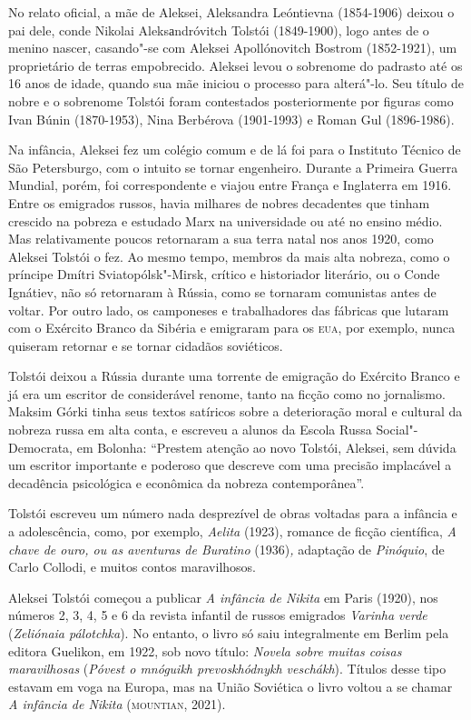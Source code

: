 \documentclass[11pt]{extarticle}
\begin{document}
No relato oficial, a mãe de Aleksei, Aleksandra Leóntievna (1854-1906)
deixou o pai dele, conde Nikolai Aleksаndróvitch Tolstói (1849-1900),
logo antes de o menino nascer, casando"-se com Aleksei Apollónovitch
Bostrom (1852-1921), um proprietário de terras empobrecido. Aleksei
levou o sobrenome do padrasto até os 16 anos de idade, quando sua mãe
iniciou o processo para alterá"-lo. Seu título de nobre e o sobrenome
Tolstói foram contestados posteriormente por figuras como Ivan Búnin
(1870-1953), Nina Berbérova (1901-1993) e Roman Gul (1896-1986).

Na infância, Aleksei fez um
colégio comum e de lá foi para o Instituto Técnico de São Petersburgo,
com o intuito se tornar engenheiro. Durante a Primeira Guerra Mundial,
porém, foi correspondente e viajou entre França e Inglaterra em
1916. Entre os emigrados russos,
havia milhares de nobres decadentes que tinham crescido na pobreza e
estudado Marx na universidade ou até no ensino médio. Mas relativamente
poucos retornaram a sua terra natal nos anos 1920, como Aleksei Tolstói
o fez. Ao mesmo tempo, membros da mais alta nobreza, como o príncipe
Dmítri Sviatopólsk"-Mirsk, crítico e historiador literário, ou o Conde
Ignátiev, não só retornaram à Rússia, como se tornaram comunistas antes
de voltar. Por outro lado, os camponeses e trabalhadores das fábricas
que lutaram com o Exército Branco da Sibéria e emigraram para os \textsc{eua},
por exemplo, nunca quiseram retornar e se tornar cidadãos soviéticos.

Tolstói deixou a Rússia durante uma torrente de emigração do Exército
Branco e já era um escritor de considerável renome, tanto na ficção como
no jornalismo. Maksim Górki tinha seus textos satíricos sobre a
deterioração moral e cultural da nobreza russa em alta conta, e escreveu
a alunos da Escola Russa Social"-Democrata, em Bolonha: ``Prestem atenção
ao novo Tolstói, Aleksei, sem dúvida um escritor importante e poderoso
que descreve com uma precisão implacável a decadência psicológica e
econômica da nobreza contemporânea''. 

Tolstói escreveu um número nada desprezível de obras voltadas para a
infância e a adolescência, como, por exemplo, \emph{Aelita} (1923),
romance de ficção científica, \emph{A chave de ouro, ou as
aventuras de Buratino} (1936)\emph{,} adaptação de \emph{Pinóquio}, de
Carlo Collodi, e muitos contos maravilhosos.

Aleksei Tolstói começou a publicar \emph{A infância de Nikita} em Paris
(1920), nos números 2, 3, 4, 5 e 6 da revista infantil de russos
emigrados \emph{Varinha verde} (\emph{Zeliónaia pálotchka}). No entanto,
o livro só saiu integralmente em Berlim pela editora Guelikon, em 1922,
sob novo título: \emph{Novela sobre muitas coisas maravilhosas}
(\emph{Póvest o mnóguikh prevoskhódnykh veschákh}). Títulos desse tipo
estavam em voga na Europa, mas na União Soviética o livro voltou a se
chamar \emph{A infância de Nikita} (\textsc{mountian}, 2021).
\end{document}
